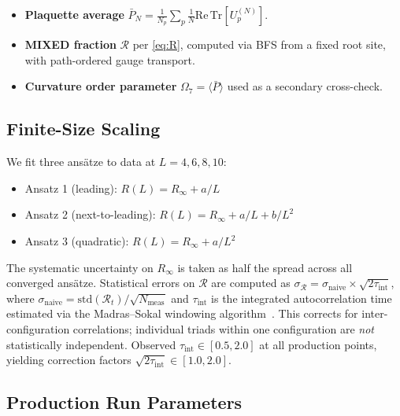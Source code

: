 \documentclass[12pt,a4paper]{article}
\newcommand{\R}{\mathcal{R}}           %
\theoremstyle{plain}
\theoremstyle{definition}
\theoremstyle{remark}
\begin{document}
\begin{itemize}
  \item \textbf{Plaquette average} $\bar{P}_N = \frac{1}{N_p}\sum_p \frac{1}{N}\mathrm{Re}\,\mathrm{Tr}[U_p^{(N)}]$.
  \item \textbf{MIXED fraction} $\R$ per \cref{eq:R}, computed via BFS from a fixed root
        site, with path-ordered gauge transport.
  \item \textbf{Curvature order parameter} $\Omega_7 = \langle\bar{P}\rangle$ used as a
        secondary cross-check.
\end{itemize}

\subsection{Finite-Size Scaling}
\label{sec:fss_method}

We fit three ansätze to data at $L=4,6,8,10$:
\begin{itemize}
  \item Ansatz 1 (leading): $R(L) = R_\infty + a/L$
  \item Ansatz 2 (next-to-leading): $R(L) = R_\infty + a/L + b/L^2$
  \item Ansatz 3 (quadratic): $R(L) = R_\infty + a/L^2$
\end{itemize}
The systematic uncertainty on $R_\infty$ is taken as half the spread across
all converged ansätze.
Statistical errors on $\R$ are computed as
$\sigma_\R = \sigma_\text{naive} \times \sqrt{2\tau_\text{int}}$,
where $\sigma_\text{naive} = \mathrm{std}(\R_t)/\sqrt{N_\text{meas}}$ and
$\tau_\text{int}$ is the integrated autocorrelation time estimated via the
Madras--Sokal windowing algorithm~\citep{Madras1988}.
This corrects for inter-configuration correlations; individual triads within one
configuration are \emph{not} statistically independent.
Observed $\tau_\text{int} \in [0.5, 2.0]$ at all production points,
yielding correction factors $\sqrt{2\tau_\text{int}} \in [1.0, 2.0]$.

\subsection{Production Run Parameters}
\end{document}
